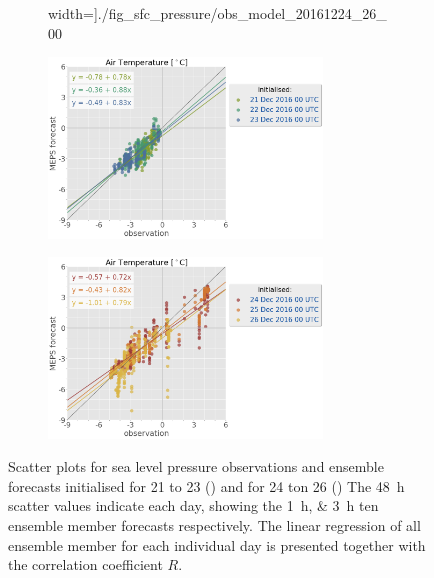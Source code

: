 \begin{figure}[t!]
\begin{subfigure}[b]{0.49\textwidth}
		width=\textwidth]{./fig_sfc_pressure/obs_model_20161224_26_00}
		\caption{}\label{fig:scat:pres2426}
	\end{subfigure}
	\begin{subfigure}[b]{0.49\textwidth}
		\centering
		\includegraphics[trim={25.cm 15.5cm 0cm 3.6cm},clip,
		width=0.8\textwidth]{./fig_sfc_temp/obs_model_20161221_23_00_label}
	\end{subfigure}
	\begin{subfigure}[b]{0.49\textwidth}
		\centering
		\includegraphics[trim={25.cm 15.5cm 0cm 3.6cm},clip,
		width=0.8\textwidth]{./fig_sfc_temp/obs_model_20161224_26_00_label}
	\end{subfigure}
	\caption{Scatter plots for sea level pressure observations and ensemble forecasts initialised for \num{21} to \SI{23}{\dec} (\protect{})
		and  for \num{24} ton \SI{26}{\dec} (\protect{})
		The \SI{48}{\hour} scatter values indicate each day, showing the \SIlist{1;3}{\hour} ten ensemble member forecasts respectively. The linear regression of all ensemble member for each individual day is presented together with the correlation coefficient $R$. %
	}\label{fig:scat:SLP}
\end{figure}
